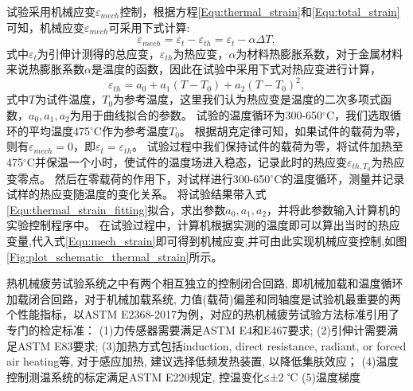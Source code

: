试验采用机械应变$\varepsilon_{mech}$控制，根据方程\ref{Equ:thermal_strain}和\ref{Equ:total_strain}可知，机械应变$\varepsilon_{mech}$可采用下式计算:
\begin{equation}
\varepsilon_{mech}=\varepsilon_{t}-\varepsilon_{th}=\varepsilon_{t}-\alpha\Delta T,
\label{Equ:mech_strain}
\end{equation}
式中$\varepsilon_{t}$为引伸计测得的总应变，$\varepsilon_{th}$为热应变，$\alpha$为材料热膨胀系数，对于金属材料来说热膨胀系数$\alpha$是温度的函数，因此在试验中采用下式对热应变进行计算，
\begin{equation}
\varepsilon_{th}=a_0+a_1(T-T_0)+a_2(T-T_0)^2,
\label{Equ:thermal_strain_fitting}
\end{equation}
式中$T$为试件温度，$T_0$为参考温度，这里我们认为热应变是温度的二次多项式函数，$a_0,a_1,a_2$为用于曲线拟合的参数。
试验的温度循环为300-650$^\circ$C，我们选取循环的平均温度475$^\circ$C作为参考温度$T_0$。
根据胡克定律可知，如果试件的载荷为零，则有$\varepsilon_{mech}=0$，即$\varepsilon_{t}=\varepsilon_{th}$。
试验过程中我们保持试件的载荷为零，将试件加热至475$^\circ$C并保温一个小时，使试件的温度场进入稳态，记录此时的热应变$\varepsilon_{th,T_0}$为热应变零点。
然后在零载荷的作用下，对试样进行300-650$^\circ$C的温度循环，测量并记录试样的热应变随温度的变化关系。
将试验结果带入式\ref{Equ:thermal_strain_fitting}拟合，求出参数$a_0,a_1,a_2$，并将此参数输入计算机的实验控制程序中。
在试验过程中，计算机根据实测的温度即可以算出当时的热应变量,代入式\ref{Equ:mech_strain}即可得到机械应变,并可由此实现机械应变控制,如图\ref{Fig:plot_schematic_thermal_strain}所示。











热机械疲劳试验系统之中有两个相互独立的控制闭合回路, 即机械加载和温度循环加载闭合回路，对于机械加载系统, 力值(载荷)偏差和同轴度是试验机最重要的两个性能指标，以ASTM E2368-2017为例，对应的热机械疲劳试验方法标准引用了专门的检定标准：
(1)力传感器需要满足ASTM E4和E467要求;
(2)引伸计需要满足ASTM E83要求;
(3)加热方式包括induction, direct resistance, radiant, or forced air heating等, 对于感应加热, 建议选择低频发热装置, 以降低集肤效应；
(4)温度控制测温系统的标定满足ASTM E220规定, 控温变化≤±2 ℃
(5)温度梯度




